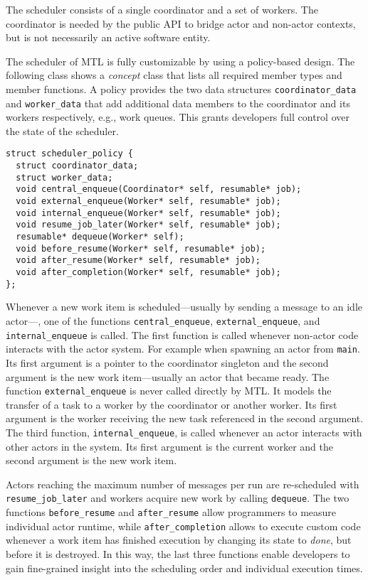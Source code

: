 The scheduler consists of a single coordinator and a set of workers. The
coordinator is needed by the public API to bridge actor and non-actor contexts,
but is not necessarily an active software entity.

The scheduler of MTL is fully customizable by using a policy-based design. The
following class shows a \emph{concept} class that lists all required member
types and member functions. A policy provides the two data structures
\lstinline^coordinator_data^ and \lstinline^worker_data^ that add additional
data members to the coordinator and its workers respectively, e.g., work
queues. This grants developers full control over the state of the scheduler.

\begin{lstlisting}
struct scheduler_policy {
  struct coordinator_data;
  struct worker_data;
  void central_enqueue(Coordinator* self, resumable* job);
  void external_enqueue(Worker* self, resumable* job);
  void internal_enqueue(Worker* self, resumable* job);
  void resume_job_later(Worker* self, resumable* job);
  resumable* dequeue(Worker* self);
  void before_resume(Worker* self, resumable* job);
  void after_resume(Worker* self, resumable* job);
  void after_completion(Worker* self, resumable* job);
};
\end{lstlisting}

Whenever a new work item is scheduled---usually by sending a message to an idle
actor---, one of the functions \lstinline^central_enqueue^,
\lstinline^external_enqueue^, and \lstinline^internal_enqueue^ is called. The
first function is called whenever non-actor code interacts with the actor
system. For example when spawning an actor from \lstinline^main^. Its first
argument is a pointer to the coordinator singleton and the second argument is
the new work item---usually an actor that became ready. The function
\lstinline^external_enqueue^ is never called directly by MTL. It models the
transfer of a task to a worker by the coordinator or another worker. Its first
argument is the worker receiving the new task referenced in the second
argument. The third function, \lstinline^internal_enqueue^, is called whenever
an actor interacts with other actors in the system. Its first argument is the
current worker and the second argument is the new work item.

Actors reaching the maximum number of messages per run are re-scheduled with
\lstinline^resume_job_later^ and workers acquire new work by calling
\lstinline^dequeue^. The two functions \lstinline^before_resume^ and
\lstinline^after_resume^ allow programmers to measure individual actor runtime,
while \lstinline^after_completion^ allows to execute custom code whenever a
work item has finished execution by changing its state to \emph{done}, but
before it is destroyed. In this way, the last three functions enable developers
to gain fine-grained insight into the scheduling order and individual execution
times.

